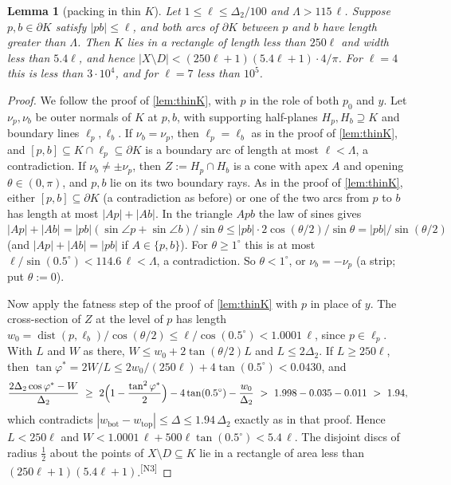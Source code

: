 \documentclass[11pt]{amsart}
\newtheorem{lemma}[theorem]{Lemma}
\theoremstyle{definition}
\theoremstyle{remark}
\newcommand{\Dt}{\Delta_2}
\newcommand{\dist}{\operatorname{dist}}
\newcommand{\chk}[1]{\textsuperscript{[#1]}}
\begin{document}
\begin{lemma}[packing in thin $K$]\label{lem:Tstar}
Let $1\le\ell\le\Dt/100$ and $\Lambda>115\,\ell$. Suppose $p,b\in\partial K$ satisfy $|pb|\le\ell$, and both arcs of $\partial K$ between $p$ and $b$ have length greater than $\Lambda$. Then $K$ lies in a rectangle of length less than $250\ell$ and width less than $5.4\ell$, and hence $|X\setminus D|<(250\ell+1)(5.4\ell+1)\cdot4/\pi$. For $\ell=4$ this is less than $3\cdot10^4$, and for $\ell=7$ less than $10^5$.
\end{lemma}
\begin{proof}
We follow the proof of \cref{lem:thinK}, with $p$ in the role of both $p_0$ and $y$. Let $\nu_p,\nu_b$ be outer normals of $K$ at $p,b$, with supporting half-planes $H_p,H_b\supseteq K$ and boundary lines $\ell_p,\ell_b$. If $\nu_b=\nu_p$, then $\ell_p=\ell_b$ as in the proof of \cref{lem:thinK}, and $[p,b]\subseteq K\cap\ell_p\subseteq\partial K$ is a boundary arc of length at most $\ell<\Lambda$, a contradiction. If $\nu_b\neq\pm\nu_p$, then $Z:=H_p\cap H_b$ is a cone with apex $A$ and opening $\theta\in(0,\pi)$, and $p,b$ lie on its two boundary rays. As in the proof of \cref{lem:thinK}, either $[p,b]\subseteq\partial K$ (a contradiction as before) or one of the two arcs from $p$ to $b$ has length at most $|Ap|+|Ab|$. In the triangle $Apb$ the law of sines gives $|Ap|+|Ab|=|pb|(\sin\angle p+\sin\angle b)/\sin\theta\le|pb|\cdot2\cos(\theta/2)/\sin\theta=|pb|/\sin(\theta/2)$ (and $|Ap|+|Ab|=|pb|$ if $A\in\{p,b\}$). For $\theta\ge1^\circ$ this is at most $\ell/\sin(0.5^\circ)<114.6\,\ell<\Lambda$, a contradiction. So $\theta<1^\circ$, or $\nu_b=-\nu_p$ (a strip; put $\theta:=0$).

Now apply the fatness step of the proof of \cref{lem:thinK} with $p$ in place of $y$. The cross-section of $Z$ at the level of $p$ has length $w_0=\dist(p,\ell_b)/\cos(\theta/2)\le\ell/\cos(0.5^\circ)<1.0001\,\ell$, since $p\in\ell_p$. With $L$ and $W$ as there, $W\le w_0+2\tan(\theta/2)L$ and $L\le2\Dt$. If $L\ge250\ell$, then $\tan\varphi^*=2W/L\le2w_0/(250\ell)+4\tan(0.5^\circ)<0.0430$, and
\[
\frac{2\Dt\cos\varphi^*-W}{\Dt}\ \ge\ 2\Bigl(1-\frac{\tan^2\varphi^*}{2}\Bigr)-4\tan(0.5^\circ)-\frac{w_0}{\Dt}\ >\ 1.998-0.035-0.011\ >\ 1.94,
\]
which contradicts $|w_{\mathrm{bot}}-w_{\mathrm{top}}|\le\Delta\le1.94\,\Dt$ exactly as in that proof. Hence $L<250\ell$ and $W<1.0001\,\ell+500\ell\tan(0.5^\circ)<5.4\,\ell$. The disjoint discs of radius $\frac12$ about the points of $X\setminus D\subseteq K$ lie in a rectangle of area less than $(250\ell+1)(5.4\ell+1)$.\chk{N3}
\end{proof}
\end{document}
